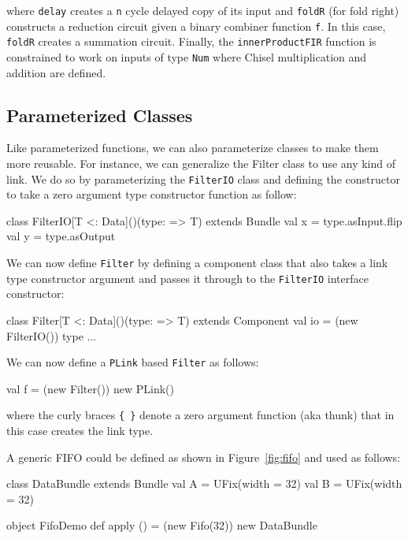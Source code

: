 \documentclass[twocolumn,10pt]{article}
\def\code#1{{\tt #1}}
\begin{document}
\noindent
where 
\code{delay} creates a \code{n} cycle delayed copy of its input and
\code{foldR} (for fold right) constructs a reduction circuit given a binary combiner function \code{f}.  
In this case, \code{foldR} creates a summation circuit.
Finally, the \code{innerProductFIR} function is constrained to work on inputs of type \code{Num} where Chisel multiplication and addition are defined.

\subsection{Parameterized Classes}

Like parameterized functions, we can also parameterize classes to make them more reusable.
For instance, we can generalize the Filter class to use any kind of link.  
We do so by parameterizing the \verb+FilterIO+ class and defining the constructor to take a zero argument type constructor function as follow:

\begin{scala}
class FilterIO[T <: Data]()(type: => T) extends Bundle { 
  val x = type.asInput.flip
  val y = type.asOutput
}
\end{scala}

\noindent
We can now define \verb+Filter+ by defining a component class that also takes a link type constructor argument and passes it through to the \verb+FilterIO+ interface constructor:

\begin{scala}
class Filter[T <: Data]()(type: => T) extends Component { 
  val io = (new FilterIO()){ type }
  ...
}
\end{scala}

\noindent
We can now define a \verb+PLink+ based \verb+Filter+ as follows:
\begin{scala}
val f = (new Filter()){ new PLink() }
\end{scala}

\noindent
where the curly braces \verb+{ }+ denote a zero argument function (aka thunk) that in this case creates the link type.

A generic FIFO could be defined as shown in Figure~\ref{fig:fifo} and
used as follows:

\begin{scala}
class DataBundle extends Bundle {
  val A = UFix(width = 32)
  val B = UFix(width = 32)
}

object FifoDemo {
  def apply () = (new Fifo(32)){ new DataBundle }
}
\end{scala}
\end{document}
